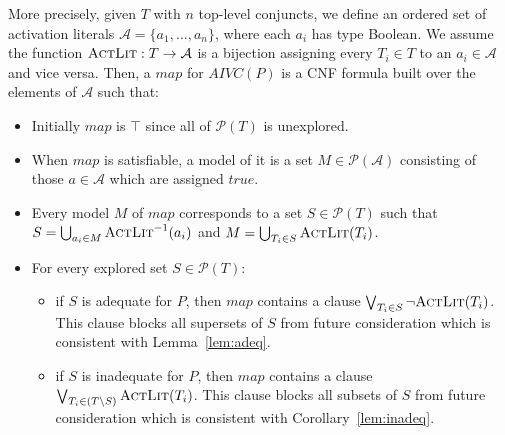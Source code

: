 More precisely, given $T$ with $n$ top-level conjuncts, we define an
ordered set of activation literals $\mathcal{A} = \{a_1, \ldots,
a_n\}$, where each $a_i$ has type Boolean. We assume the function
$\textsc{ActLit} : T \rightarrow \mathcal{A}$ is a bijection assigning every
$T_i \in T$ to an $a_i \in \mathcal{A}$ and vice versa. Then, a $map$
for $AIVC(P)$ is a CNF formula built over the elements of
$\mathcal{A}$ such that:
\begin{itemize}
  \item Initially $map$ is $\top$ since all of $\mathcal{P}(T)$ is unexplored.

  \item When $map$ is satisfiable, a model of it is a set
  $M \in \mathcal{P}(\mathcal{A})$ consisting of those $a \in
    \mathcal{A}$ which are assigned $true$.

  \item Every model $M$ of $map$ corresponds to a set $S \in \mathcal{P}(T)$ such that
$S = \bigcup_{a_i \in M} \textsc{ActLit} ^{-1} (a_i)$ and $M = \bigcup_{T_i \in S} \textsc{ActLit}(T_i)$.
\vspace{0.05in}
  \item For every explored set $S \in \mathcal{P}(T)$:
  \begin{itemize}
    \item if $S$ is adequate for $P$, then $map$ contains a clause
      $\bigvee_{T_{i}\in S} \neg {\textsc{ActLit}(T_i)}$. This clause blocks
      all supersets of $S$ from future consideration which is
      consistent with Lemma~\ref{lem:adeq}.

    \item if $S$ is inadequate for $P$, then $map$ contains a clause
      $\bigvee_{T_{i}\in (T \setminus S)} \textsc{ActLit} (T_i)$. This clause
      blocks all subsets of $S$ from future consideration which is
      consistent with Corollary~\ref{lem:inadeq}.
  \end{itemize}
\end{itemize}


